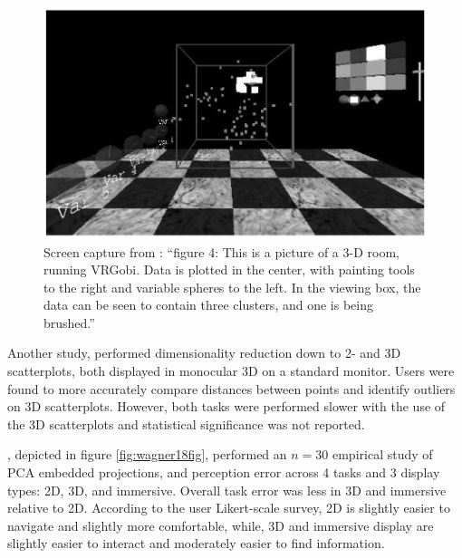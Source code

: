 \documentclass{monashthesis}
\begin{document}
\begin{figure}

{\centering \includegraphics[width=0.7\linewidth]{./figures/nelson98fig} 

}

\caption{Screen capture from \textcite{nelson_xgobi_1998}:
``figure 4: This is a picture of a 3-D room, running VRGobi. Data is
plotted in the center, with painting tools to the right and variable
spheres to the left. In the viewing box, the data can be seen to contain
three clusters, and one is being brushed.''}\label{fig:nelson98fig}
\end{figure}

Another study, \textcite{gracia_new_2016} performed dimensionality
reduction down to 2- and 3D scatterplots, both displayed in monocular 3D
on a standard monitor. Users were found to more accurately compare
distances between points and identify outliers on 3D scatterplots.
However, both tasks were performed slower with the use of the 3D
scatterplots and statistical significance was not reported.

\textcite{wagner_filho_immersive_2018}, depicted in figure
\ref{fig:wagner18fig}, performed an \(n=30\) empirical study of PCA
embedded projections, and perception error across 4 tasks and 3 display
types: 2D, 3D, and immersive. Overall task error was less in 3D and
immersive relative to 2D. According to the user Likert-scale survey, 2D
is slightly easier to navigate and slightly more comfortable, while, 3D
and immersive display are slightly easier to interact and moderately
easier to find information.
\end{document}
